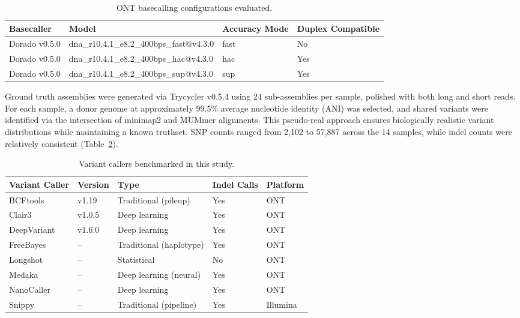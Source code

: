 \documentclass[11pt]{article}
\begin{document}
\begin{table}[ht]
\centering
\caption{ONT basecalling configurations evaluated.}
\label{tab:basecalling}
\begin{tabular}{llll}
\toprule
Basecaller & Model & Accuracy Mode & Duplex Compatible \\
\midrule
Dorado v0.5.0 & dna\_r10.4.1\_e8.2\_400bps\_fast@v4.3.0 & fast & No \\
Dorado v0.5.0 & dna\_r10.4.1\_e8.2\_400bps\_hac@v4.3.0 & hac & Yes \\
Dorado v0.5.0 & dna\_r10.4.1\_e8.2\_400bps\_sup@v4.3.0 & sup & Yes \\
\bottomrule
\end{tabular}
\end{table}

Ground truth assemblies were generated via Trycycler v0.5.4 using 24 sub-assemblies per sample, polished with both long and short reads. For each sample, a donor genome at approximately 99.5\% average nucleotide identity (ANI) was selected, and shared variants were identified via the intersection of minimap2 and MUMmer alignments. This pseudo-real approach ensures biologically realistic variant distributions while maintaining a known truthset. SNP counts ranged from 2,102 to 57,887 across the 14 samples, while indel counts were relatively consistent (Table~\ref{tab:callers}).

\begin{table}[ht]
\centering
\caption{Variant callers benchmarked in this study.}
\label{tab:callers}
\begin{tabular}{lllll}
\toprule
Variant Caller & Version & Type & Indel Calls & Platform \\
\midrule
BCFtools & v1.19 & Traditional (pileup) & Yes & ONT \\
Clair3 & v1.0.5 & Deep learning & Yes & ONT \\
DeepVariant & v1.6.0 & Deep learning & Yes & ONT \\
FreeBayes & -- & Traditional (haplotype) & Yes & ONT \\
Longshot & -- & Statistical & No & ONT \\
Medaka & -- & Deep learning (neural) & Yes & ONT \\
NanoCaller & -- & Deep learning & Yes & ONT \\
Snippy & -- & Traditional (pipeline) & Yes & Illumina \\
\bottomrule
\end{tabular}
\end{table}
\end{document}
